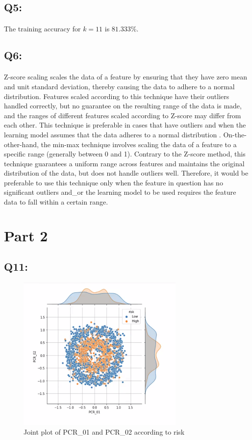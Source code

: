 \documentclass{article}
\begin{document}
\subsection*{Q5:}
    \paragraph*{}
    The training accuracy for $k=11$ is $81.333\%$.

\subsection*{Q6:}
    \paragraph*{}
    Z-score scaling scales the data of a feature by ensuring that they have zero mean and unit standard deviation, thereby causing the data to adhere to a normal distribution. Features scaled according to this technique have their outliers handled correctly, but no guarantee on the resulting range of the data is made, and the ranges of different features scaled according to Z-score may differ from each other. This technique is preferable in cases that have outliers and when the learning model assumes that the data adheres to a normal distribution . On-the-other-hand, the min-max technique involves scaling the data of a feature to a specific range (generally between 0 and 1). Contrary to the Z-score method, this technique guarantees a uniform range across features and maintains the original distribution of the data, but does not handle outliers well. Therefore, it would be preferable to use this technique only when the feature in question has no significant outliers and\_or the learning model to be used requires the feature data to fall within a certain range.
\section*{Part 2}
\subsection*{Q11:}
    \begin{figure}[H]
        \centering
        \includegraphics{q11_pcr_01_pcr_02_j_plot.png}
        \caption{Joint plot of PCR\_01 and PCR\_02 according to risk}
        \label{fig:pcr_01_pcr_02_j_plot}
    \end{figure}
\end{document}
